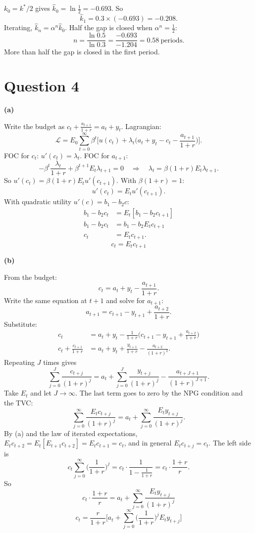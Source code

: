 \documentclass[12pt]{article}
\newcommand{\E}{E}
\newcommand{\pt}[1]{\par\bigskip\textbf{(#1)}\par}
\newcommand{\ans}[1]{\[\boxed{\ #1\ }\]}
\begin{document}
$k_0=k^*/2$ gives $\hat k_0=\ln\frac12=-0.693$. So
\[
\hat k_1=0.3\times(-0.693)=-0.208 .
\]
Iterating, $\hat k_n=\alpha^n\hat k_0$. Half the gap is closed when
$\alpha^n=\frac12$:
\[
n=\frac{\ln0.5}{\ln0.3}=\frac{-0.693}{-1.204}=0.58\ \text{periods}.
\]
More than half the gap is closed in the first period.

\section*{Question 4}

\pt{a}
Write the budget as $c_t+\frac{a_{t+1}}{1+r}=a_t+y_t$. Lagrangian:
\[
\mathcal L=\E_0\sum_{t=0}^\infty\beta^t\Big[u(c_t)+\lambda_t\Big(a_t+y_t-c_t-\frac{a_{t+1}}{1+r}\Big)\Big].
\]
FOC for $c_t$: $u'(c_t)=\lambda_t$.
FOC for $a_{t+1}$:
\[
-\beta^t\frac{\lambda_t}{1+r}+\beta^{t+1}\E_t\lambda_{t+1}=0\quad\Longrightarrow\quad\lambda_t=\beta(1+r)\E_t\lambda_{t+1}.
\]
So $u'(c_t)=\beta(1+r)\E_tu'(c_{t+1})$. With $\beta(1+r)=1$:
\[
u'(c_t)=\E_tu'(c_{t+1}).
\]
With quadratic utility $u'(c)=b_1-b_2c$:
\begin{align*}
b_1-b_2c_t&=\E_t[b_1-b_2c_{t+1}]\\
b_1-b_2c_t&=b_1-b_2\E_tc_{t+1}\\
c_t&=\E_tc_{t+1}.
\end{align*}
\ans{c_t=\E_tc_{t+1}}

\pt{b}
From the budget:
\[
c_t=a_t+y_t-\frac{a_{t+1}}{1+r}.
\]
Write the same equation at $t+1$ and solve for $a_{t+1}$:
\[
a_{t+1}=c_{t+1}-y_{t+1}+\frac{a_{t+2}}{1+r}.
\]
Substitute:
\begin{align*}
c_t&=a_t+y_t-\frac{1}{1+r}\Big(c_{t+1}-y_{t+1}+\frac{a_{t+2}}{1+r}\Big)\\
c_t+\frac{c_{t+1}}{1+r}&=a_t+y_t+\frac{y_{t+1}}{1+r}-\frac{a_{t+2}}{(1+r)^2}.
\end{align*}
Repeating $J$ times gives
\[
\sum_{j=0}^J\frac{c_{t+j}}{(1+r)^j}=a_t+\sum_{j=0}^J\frac{y_{t+j}}{(1+r)^j}-\frac{a_{t+J+1}}{(1+r)^{J+1}}.
\]
Take $\E_t$ and let $J\to\infty$. The last term goes to zero by the NPG
condition and the TVC:
\[
\sum_{j=0}^\infty\frac{\E_tc_{t+j}}{(1+r)^j}=a_t+\sum_{j=0}^\infty\frac{\E_ty_{t+j}}{(1+r)^j}.
\]
By (a) and the law of iterated expectations,
$\E_tc_{t+2}=\E_t[\E_{t+1}c_{t+2}]=\E_tc_{t+1}=c_t$, and in general
$\E_tc_{t+j}=c_t$. The left side is
\[
c_t\sum_{j=0}^\infty\Big(\frac{1}{1+r}\Big)^j=c_t\cdot\frac{1}{1-\frac{1}{1+r}}=c_t\cdot\frac{1+r}{r}.
\]
So
\[
c_t\cdot\frac{1+r}{r}=a_t+\sum_{j=0}^\infty\frac{\E_ty_{t+j}}{(1+r)^j}
\]
\ans{c_t=\frac{r}{1+r}\Big[a_t+\sum_{j=0}^\infty\Big(\frac{1}{1+r}\Big)^j\E_ty_{t+j}\Big]}
\end{document}
